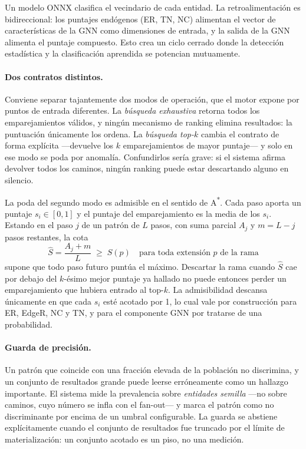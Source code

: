 \documentclass[11pt,a4paper]{article}
\begin{document}
Un modelo ONNX clasifica el vecindario de cada entidad. La retroalimentación es
bidireccional: los puntajes endógenos (ER, TN, NC) alimentan el vector de
características de la GNN como dimensiones de entrada, y la salida de la GNN
alimenta el puntaje compuesto. Esto crea un ciclo cerrado donde la detección
estadística y la clasificación aprendida se potencian mutuamente. \paragraph{Dos contratos distintos.} Conviene separar tajantemente dos modos de
operación, que el motor expone por puntos de entrada diferentes. La
\emph{búsqueda exhaustiva} retorna todos los emparejamientos válidos, y ningún
mecanismo de ranking elimina resultados: la puntuación únicamente los ordena.
La \emph{búsqueda top-$k$} cambia el contrato de forma explícita ---devuelve
los $k$ emparejamientos de mayor puntaje--- y solo en ese modo se poda por
anomalía. Confundirlos sería grave: si el sistema afirma devolver todos los
caminos, ningún ranking puede estar descartando alguno en silencio.

La poda del segundo modo es admisible en el sentido de A\textsuperscript{*}.
Cada paso aporta un puntaje $s_i \in [0,1]$ y el puntaje del emparejamiento es
la media de los $s_i$. Estando en el paso $j$ de un patrón de $L$ pasos, con
suma parcial $A_j$ y $m = L - j$ pasos restantes, la cota
\[
\hat{S} = \frac{A_j + m}{L} \;\geq\; S(p)
\quad\text{para toda extensión } p \text{ de la rama}
\]
supone que todo paso futuro puntúa el máximo. Descartar la rama cuando
$\hat{S}$ cae por debajo del $k$-ésimo mejor puntaje ya hallado no puede
entonces perder un emparejamiento que hubiera entrado al top-$k$. La
admisibilidad descansa únicamente en que cada $s_i$ esté acotado por 1, lo cual
vale por construcción para ER, EdgeR, NC y TN, y para el componente GNN por
tratarse de una probabilidad.

\paragraph{Guarda de precisión.} Un patrón que coincide con una fracción
elevada de la población no discrimina, y un conjunto de resultados grande puede
leerse erróneamente como un hallazgo importante. El sistema mide la prevalencia
sobre \emph{entidades semilla} ---no sobre caminos, cuyo número se infla con el
fan-out--- y marca el patrón como no discriminante por encima de un umbral
configurable. La guarda se abstiene explícitamente cuando el conjunto de
resultados fue truncado por el límite de materialización: un conjunto acotado
es un piso, no una medición.
\end{document}
